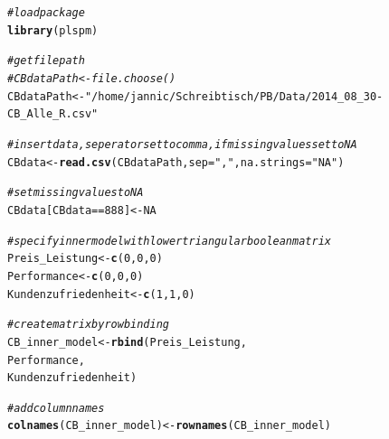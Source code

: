 \documentclass{article}\usepackage[]{graphicx}\usepackage[]{color}
\makeatletter
\newcommand{\hlnum}[1]{\textcolor[rgb]{0.686,0.059,0.569}{#1}}%
\newcommand{\hlstr}[1]{\textcolor[rgb]{0.192,0.494,0.8}{#1}}%
\newcommand{\hlcom}[1]{\textcolor[rgb]{0.678,0.584,0.686}{\textit{#1}}}%
\newcommand{\hlopt}[1]{\textcolor[rgb]{0,0,0}{#1}}%
\newcommand{\hlstd}[1]{\textcolor[rgb]{0.345,0.345,0.345}{#1}}%
\newcommand{\hlkwb}[1]{\textcolor[rgb]{0.69,0.353,0.396}{#1}}%
\newcommand{\hlkwc}[1]{\textcolor[rgb]{0.333,0.667,0.333}{#1}}%
\newcommand{\hlkwd}[1]{\textcolor[rgb]{0.737,0.353,0.396}{\textbf{#1}}}%
\newenvironment{kframe}{%
 \def\at@end@of@kframe{}%
 \ifinner\ifhmode%
  \def\at@end@of@kframe{\end{minipage}}%
  \begin{minipage}{\columnwidth}%
 \fi\fi%
 \def\FrameCommand##1{\hskip\@totalleftmargin \hskip-\fboxsep
 \colorbox{shadecolor}{##1}\hskip-\fboxsep
     \hskip-\linewidth \hskip-\@totalleftmargin \hskip\columnwidth}%
 \MakeFramed {\advance\hsize-\width
   \@totalleftmargin\z@ \linewidth\hsize
   \@setminipage}}%
 {\par\unskip\endMakeFramed%
 \at@end@of@kframe}
\newenvironment{knitrout}{}{} %
\makeatother
\begin{document}
\begin{knitrout}
\color{fgcolor}\begin{kframe}
\begin{alltt}
\hlcom{#load package}
\hlkwd{library}\hlstd{(plspm)}

\hlcom{#get filepath}
\hlcom{#CBdataPath <- file.choose()}
\hlstd{CBdataPath} \hlkwb{<-} \hlstr{"/home/jannic/Schreibtisch/PB/Data/2014_08_30-CB_Alle_R.csv"}

\hlcom{#insert data, seperator set to comma, if missing values set to NA}
\hlstd{CBdata} \hlkwb{<-} \hlkwd{read.csv}\hlstd{(CBdataPath,} \hlkwc{sep} \hlstd{=}\hlstr{","}\hlstd{,}\hlkwc{na.strings}\hlstd{=}\hlstr{"NA"}\hlstd{)}

\hlcom{#set missing values to NA}
\hlstd{CBdata[CBdata} \hlopt{==} \hlnum{888}\hlstd{]} \hlkwb{<-} \hlnum{NA}

\hlcom{#specify inner model with lower triangular boolean matrix}
\hlstd{Preis_Leistung} \hlkwb{<-} \hlkwd{c}\hlstd{(}\hlnum{0}\hlstd{,}\hlnum{0}\hlstd{,}\hlnum{0}\hlstd{)}
\hlstd{Performance} \hlkwb{<-} \hlkwd{c}\hlstd{(}\hlnum{0}\hlstd{,}\hlnum{0}\hlstd{,}\hlnum{0}\hlstd{)}
\hlstd{Kundenzufriedenheit} \hlkwb{<-} \hlkwd{c}\hlstd{(}\hlnum{1}\hlstd{,}\hlnum{1}\hlstd{,}\hlnum{0}\hlstd{)}


\hlcom{#create matrix by row binding}
\hlstd{CB_inner_model} \hlkwb{<-} \hlkwd{rbind}\hlstd{(Preis_Leistung,}
                        \hlstd{Performance,}
                        \hlstd{Kundenzufriedenheit)}

\hlcom{#add column names }
\hlkwd{colnames}\hlstd{(CB_inner_model)} \hlkwb{<-} \hlkwd{rownames}\hlstd{(CB_inner_model)}


\end{alltt}
\end{kframe}
\end{knitrout}
\end{document}
